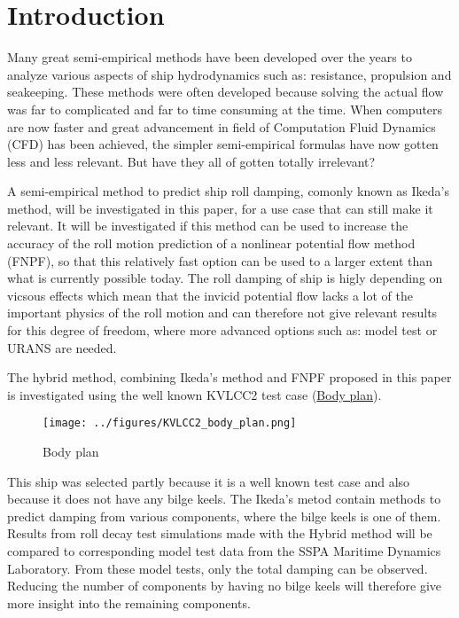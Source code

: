 \section{Introduction}\label{introduction}

Many great semi-empirical methods have been developed over the years to
analyze various aspects of ship hydrodynamics such as: resistance,
propulsion and seakeeping. These methods were often developed because
solving the actual flow was far to complicated and far to time consuming
at the time. When computers are now faster and great advancement in
field of Computation Fluid Dynamics (CFD) has been achieved, the simpler
semi-empirical formulas have now gotten less and less relevant. But have
they all of gotten totally irrelevant?

A semi-empirical method to predict ship roll damping, comonly known as
Ikeda's method, will be investigated in this paper, for a use case that
can still make it relevant. It will be investigated if this method can
be used to increase the accuracy of the roll motion prediction of a
nonlinear potential flow method (FNPF), so that this relatively fast
option can be used to a larger extent than what is currently possible
today. The roll damping of ship is higly depending on vicsous effects
which mean that the invicid potential flow lacks a lot of the important
physics of the roll motion and can therefore not give relevant results
for this degree of freedom, where more advanced options such as: model
test or URANS are needed.

The hybrid method, combining Ikeda's method and FNPF proposed in this
paper is investigated using the well known KVLCC2 test case
(\href{../../notebooks/11.1_KVLCC2_geometry.ipynb\#bodyplan}{Body
plan}).

\begin{figure}
\centering
\texttt{[image: ../figures/KVLCC2\_body\_plan.png]}
\caption{Body plan}
\end{figure}

This ship was selected partly because it is a well known test case and
also because it does not have any bilge keels. The Ikeda's metod contain
methods to predict damping from various components, where the bilge
keels is one of them. Results from roll decay test simulations made with
the Hybrid method will be compared to corresponding model test data from
the SSPA Maritime Dynamics Laboratory. From these model tests, only the
total damping can be observed. Reducing the number of components by
having no bilge keels will therefore give more insight into the
remaining components.


